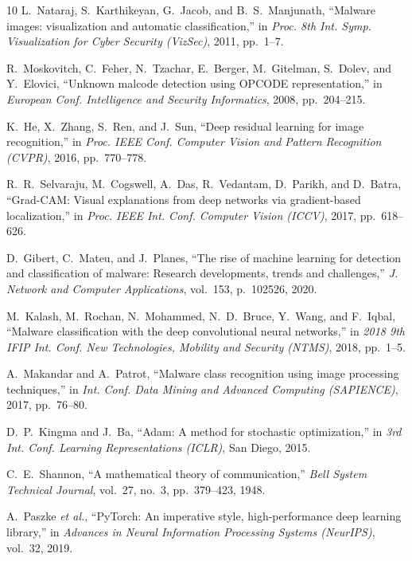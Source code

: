 \documentclass[journal,10pt,twocolumn]{IEEEtran}
\begin{document}
\begin{thebibliography}{10}
L.~Nataraj, S.~Karthikeyan, G.~Jacob, and B.~S.~Manjunath, ``Malware images: visualization and automatic classification,'' in \emph{Proc. 8th Int. Symp. Visualization for Cyber Security (VizSec)}, 2011, pp.~1--7.

R.~Moskovitch, C.~Feher, N.~Tzachar, E.~Berger, M.~Gitelman, S.~Dolev, and Y.~Elovici, ``Unknown malcode detection using OPCODE representation,'' in \emph{European Conf. Intelligence and Security Informatics}, 2008, pp.~204--215.

K.~He, X.~Zhang, S.~Ren, and J.~Sun, ``Deep residual learning for image recognition,'' in \emph{Proc. IEEE Conf. Computer Vision and Pattern Recognition (CVPR)}, 2016, pp.~770--778.

R.~R.~Selvaraju, M.~Cogswell, A.~Das, R.~Vedantam, D.~Parikh, and D.~Batra, ``Grad-CAM: Visual explanations from deep networks via gradient-based localization,'' in \emph{Proc. IEEE Int. Conf. Computer Vision (ICCV)}, 2017, pp.~618--626.

D.~Gibert, C.~Mateu, and J.~Planes, ``The rise of machine learning for detection and classification of malware: Research developments, trends and challenges,'' \emph{J. Network and Computer Applications}, vol.~153, p.~102526, 2020.

M.~Kalash, M.~Rochan, N.~Mohammed, N.~D.~Bruce, Y.~Wang, and F.~Iqbal, ``Malware classification with the deep convolutional neural networks,'' in \emph{2018 9th IFIP Int. Conf. New Technologies, Mobility and Security (NTMS)}, 2018, pp.~1--5.

A.~Makandar and A.~Patrot, ``Malware class recognition using image processing techniques,'' in \emph{Int. Conf. Data Mining and Advanced Computing (SAPIENCE)}, 2017, pp.~76--80.

D.~P.~Kingma and J.~Ba, ``Adam: A method for stochastic optimization,'' in \emph{3rd Int. Conf. Learning Representations (ICLR)}, San Diego, 2015.

C.~E.~Shannon, ``A mathematical theory of communication,'' \emph{Bell System Technical Journal}, vol.~27, no.~3, pp.~379--423, 1948.

A.~Paszke \emph{et al.}, ``PyTorch: An imperative style, high-performance deep learning library,'' in \emph{Advances in Neural Information Processing Systems (NeurIPS)}, vol.~32, 2019.
\end{thebibliography}
\end{document}
